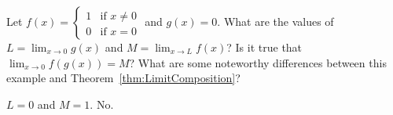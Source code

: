 \begin{enumialphparenastyle}
\begin{ex}
Let $f(x)=\left\{ 
\begin{array}{cc}
1 & \text{if }x\neq 0 \\ 
0 & \text{if }x=0%
\end{array}%
\right.$ and $g(x)=0$. What are the values of $
L=\lim_{x\to 0}g(x)$ and $M=\lim_{x\to L}f(x)$? Is it true that $\lim_{x\to	0}f(g(x))=M$? What are some noteworthy differences
between this example and Theorem~\ref{thm:LimitComposition}?
\begin{sol}
	$L=0$ and $M=1.$ No.
\end{sol}
\end{ex}

\end{enumialphparenastyle}

\clearpage